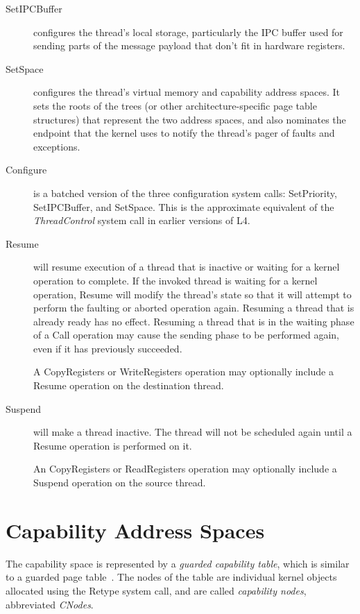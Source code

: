 \begin{description}
\item [SetIPCBuffer] configures the thread's local storage, particularly the IPC buffer used for sending parts of the message payload that don't fit in hardware registers.

\item [SetSpace] configures the thread's virtual memory and capability address spaces. It sets the roots of the trees (or other architecture-specific page table structures) that represent the two address spaces, and also nominates the endpoint that the kernel uses to notify the thread's pager of faults and exceptions.

\item [Configure] is a batched version of the three configuration system calls: SetPriority, SetIPCBuffer, and SetSpace. This is the approximate equivalent of the \emph{ThreadControl} system call in earlier versions of L4.

\item[Resume] will resume execution of a thread that is inactive or waiting
for a kernel operation to complete. If the invoked thread is waiting for a
kernel operation, Resume will modify the thread's state so that it will attempt
to perform the faulting or aborted operation again. Resuming a thread that is
already ready has no effect. Resuming a thread that is in the waiting phase of
a Call operation may cause the sending phase to be performed again, even if
it has previously succeeded.

A CopyRegisters or WriteRegisters operation may optionally include a Resume operation on the destination thread.

\item[Suspend] will make a thread inactive. The thread will not be scheduled
again until a Resume operation is performed on it.

An CopyRegisters or ReadRegisters operation may optionally include a Suspend operation on the source thread.
\end{description}

\section{Capability Address Spaces}\label{sec:overview.cspace}

The capability space is represented by a \emph{guarded capability table},
which is similar to a guarded page table~\cite{Liedtke-94a}. The nodes of the
table are individual kernel objects allocated using the Retype system call,
and are called \emph{capability nodes}, abbreviated \emph{CNodes}.

